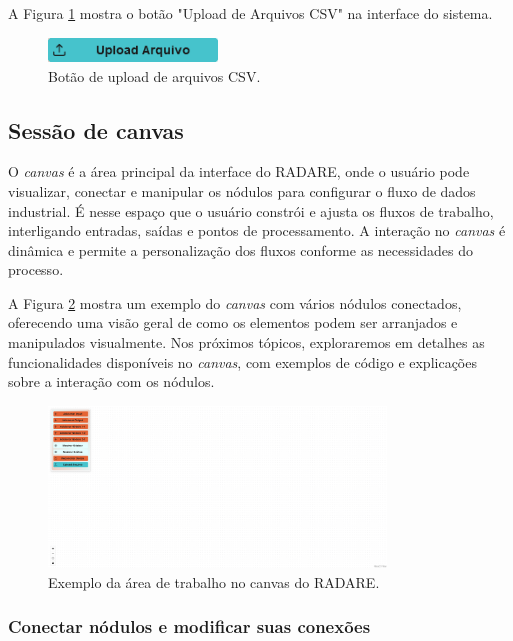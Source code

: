 A Figura \ref{Fig:UploadCSVButton} mostra o botão "Upload de Arquivos CSV" na interface do sistema.

\begin{figure}[htbp]
    \centering
    \includegraphics[width=0.4\textwidth]{figuras/upload-csv-button.png}
    \caption{Botão de upload de arquivos CSV.}
    \label{Fig:UploadCSVButton}
\end{figure}

\subsection{Sessão de canvas}

O \textit{canvas} é a área principal da interface do RADARE, onde o usuário pode visualizar, conectar e manipular os nódulos para configurar o fluxo de dados industrial. É nesse espaço que o usuário constrói e ajusta os fluxos de trabalho, interligando entradas, saídas e pontos de processamento. A interação no \textit{canvas} é dinâmica e permite a personalização dos fluxos conforme as necessidades do processo.

A Figura \ref{Fig:CanvasArea} mostra um exemplo do \textit{canvas} com vários nódulos conectados, oferecendo uma visão geral de como os elementos podem ser arranjados e manipulados visualmente. Nos próximos tópicos, exploraremos em detalhes as funcionalidades disponíveis no \textit{canvas}, com exemplos de código e explicações sobre a interação com os nódulos.

\begin{figure}[htbp]
    \centering
    \includegraphics[width=0.8\textwidth]{figuras/empty-canvas.png}
    \caption{Exemplo da área de trabalho no canvas do RADARE.}
    \label{Fig:CanvasArea}
\end{figure}

\subsubsection{Conectar nódulos e modificar suas conexões}


